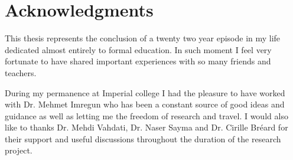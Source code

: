 %
%
%
\chapter*{Acknowledgments}
%
 This thesis represents the conclusion of a twenty two year episode
 in my life dedicated almost entirely to formal education.
 In such moment I feel very  fortunate to have
 shared important experiences with so many friends and teachers.
 
 During my permanence at Imperial college I had the pleasure
 to have worked with Dr. Mehmet Imregun who has been a constant
 source of good ideas and guidance as well as letting me the freedom
 of research and travel.
 I would also like to thanks Dr. Mehdi Vahdati, Dr. Naser Sayma and
 Dr. Cirille Br\'{e}ard
 for their support and useful discussions throughout the duration of
 the research project.
 

